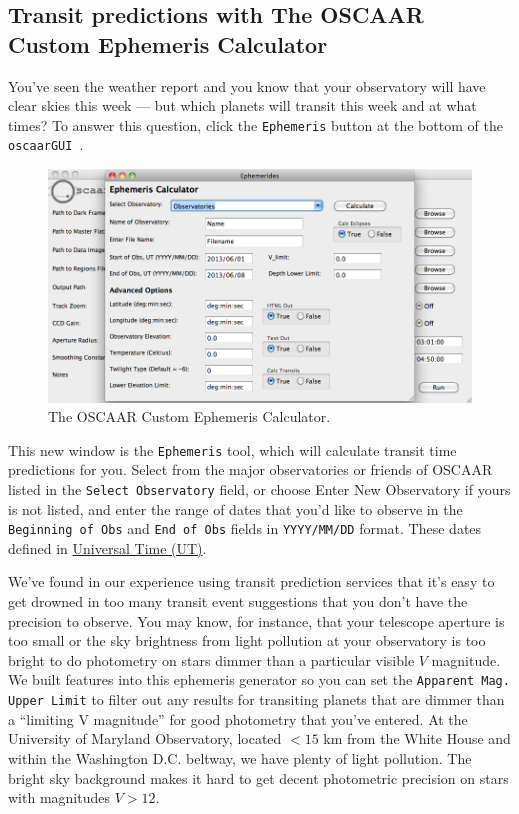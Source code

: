 \documentclass[a4paper]{article}
\newcommand{\code}[1]{\texttt{#1}}
\newcommand{\gui}{\code{oscaarGUI}~}
\begin{document}
\subsection{Transit predictions with The OSCAAR Custom Ephemeris Calculator}
You've seen the weather report and you know that your observatory will have clear skies this week --- but which planets will transit this week and at what times? To answer this question, click the \code{Ephemeris} button at the bottom of the \gui.
\begin{figure}[H]
\begin{center}
\includegraphics[scale=0.35]{imgs/ephemeris.png}
\caption{The OSCAAR Custom Ephemeris Calculator.}
\label{fig:ephgui}
\end{center}	
\end{figure}

This new window is the \code{Ephemeris} tool, which will calculate transit time predictions for you. Select from the major observatories or friends of OSCAAR listed in the \code{Select Observatory} field, or choose Enter New Observatory if yours is not listed, and enter the range of dates that you'd like to observe in the \code{Beginning of Obs} and \code{End of Obs} fields in \code{YYYY/MM/DD} format.  These dates defined in \href{http://en.wikipedia.org/wiki/Universal_time}{Universal Time (UT)}.

We've found in our experience using transit prediction services that it's easy to get drowned in too many transit event suggestions that you don't have the precision to observe. You may know, for instance, that your telescope aperture is too small or the sky brightness from light pollution at your observatory is too bright to do photometry on stars dimmer than a particular visible $V$ magnitude. We built features into this ephemeris generator so you can set the \code{Apparent Mag. Upper Limit} to filter out any results for transiting planets that are dimmer than a ``limiting V magnitude'' for good photometry that you've entered. At the University of Maryland Observatory, located $<15$ km from the White House and within the Washington D.C. beltway, we have plenty of light pollution. The bright sky background makes it hard to get decent photometric precision on stars with magnitudes $V>12$.
\end{document}
